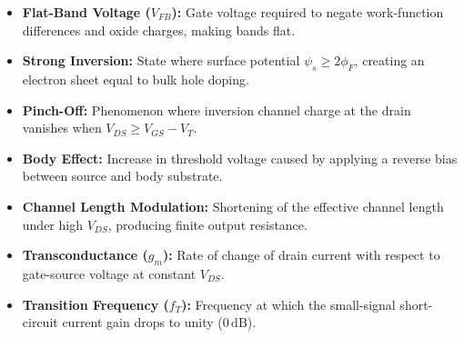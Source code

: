 \documentclass[12pt,a4paper]{article}
\begin{document}
\begin{tcolorbox}[defbox, title={\textbf{One-Line Definitions}}]
\begin{itemize}[leftmargin=*, itemsep=2pt, topsep=0pt]
  \item \textbf{Flat-Band Voltage ($V_{FB}$):} Gate voltage required to negate work-function differences and oxide charges, making bands flat.
  \item \textbf{Strong Inversion:} State where surface potential $\psi_s \ge 2\phi_F$, creating an electron sheet equal to bulk hole doping.
  \item \textbf{Pinch-Off:} Phenomenon where inversion channel charge at the drain vanishes when $V_{DS} \ge V_{GS} - V_T$.
  \item \textbf{Body Effect:} Increase in threshold voltage caused by applying a reverse bias between source and body substrate.
  \item \textbf{Channel Length Modulation:} Shortening of the effective channel length under high $V_{DS}$, producing finite output resistance.
  \item \textbf{Transconductance ($g_m$):} Rate of change of drain current with respect to gate-source voltage at constant $V_{DS}$.
  \item \textbf{Transition Frequency ($f_T$):} Frequency at which the small-signal short-circuit current gain drops to unity ($0\,\text{dB}$).
\end{itemize}
\end{tcolorbox}
\end{document}
